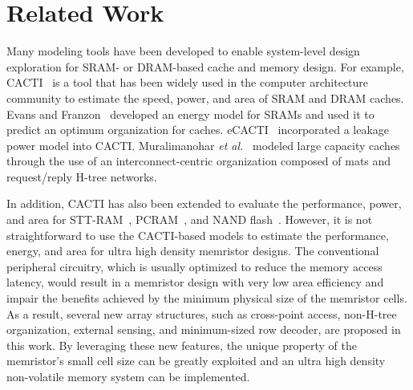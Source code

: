 \section{Related Work} \label{sec:relate}

Many modeling tools have been developed to enable system-level design exploration for SRAM- or DRAM-based cache and memory design.  For example, CACTI~\cite{CACTI51} is a tool that has been widely used in the computer architecture community to estimate the speed, power, and area of SRAM and DRAM caches.  Evans and Franzon~\cite{CACTI:JSSC95:Evans} developed an energy model for SRAMs and used it to predict an optimum organization for caches.  eCACTI~\cite{eCACTI} incorporated a leakage power model into CACTI.  Muralimanohar \emph{et al.}~\cite{CACTI60} modeled large capacity caches through the use of an interconnect-centric organization composed of mats and request/reply H-tree networks.

In addition, CACTI has also been extended to evaluate the performance, power, and area for STT-RAM~\cite{CACTI:DAC08:Dong}, PCRAM~\cite{CACTI:PCRAMsim}, and NAND flash~\cite{CACTI:DATE10:Mohan}. However, it is not straightforward to use the CACTI-based models to estimate the performance, energy, and area for ultra high density memristor designs.  The conventional peripheral circuitry, which is usually optimized to reduce the memory access latency, would result in a memristor design with very low area efficiency and impair the benefits achieved by the minimum physical size of the memristor cells.  As a result, several new array structures, such as cross-point access, non-H-tree organization, external sensing, and minimum-sized row decoder, are proposed in this work.  By leveraging these new features, the unique property of the memristor's small cell size can be greatly exploited and an ultra high density non-volatile memory system can be implemented. 